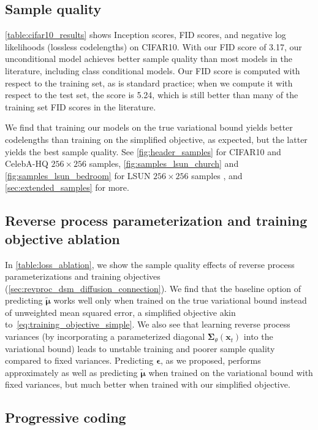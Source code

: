 \subsection{Sample quality}

\ref{table:cifar10_results} shows Inception scores, FID scores, and negative log likelihoods (lossless codelengths) on CIFAR10. With our FID score of 3.17, our unconditional model achieves better sample quality than most models in the literature, including class conditional models. Our FID score is computed with respect to the training set, as is standard practice; when we compute it with respect to the test set, the score is 5.24, which is still better than many of the training set FID scores in the literature.

We find that training our models on the true variational bound yields better codelengths than training on the simplified objective, as expected, but the latter yields the best sample quality. See \ref{fig:header_samples} for CIFAR10 and CelebA-HQ $256 \times 256$ samples, \ref{fig:samples_lsun_church} and \ref{fig:samples_lsun_bedroom} for LSUN $256 \times 256$ samples \cite{yu15lsun}, and \ref{sec:extended_samples} for more.

\subsection{Reverse process parameterization and training objective ablation}
\label{sec:loss_ablation}

In \ref{table:loss_ablation}, we show the sample quality effects of reverse process parameterizations and training objectives (\ref{sec:revproc_dsm_diffusion_connection}). We find that the baseline option of predicting $\tilde{\boldsymbol{\mu}}$ works well only when trained on the true variational bound instead of unweighted mean squared error, a simplified objective akin to~\ref{eq:training_objective_simple}. We also see that learning reverse process variances (by incorporating a parameterized diagonal ${\boldsymbol{\Sigma}}_\theta(\mathbf{x}_t)$ into the variational bound) leads to unstable training and poorer sample quality compared to fixed variances. Predicting ${\boldsymbol{\epsilon}}$, as we proposed, performs approximately as well as predicting $\tilde{\boldsymbol{\mu}}$ when trained on the variational bound with fixed variances, but much better when trained with our simplified objective.

\subsection{Progressive coding}
\label{sec:coding}

